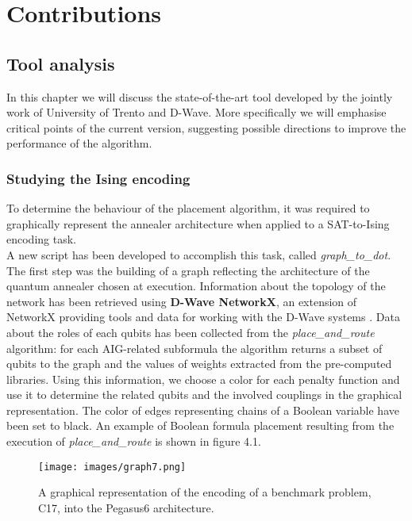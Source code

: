 \part{Contributions}

\chapter{Tool analysis}
\label{cha:analysis}

In this chapter we will discuss the state-of-the-art tool developed by the jointly work of University of Trento and D-Wave. More specifically we will emphasise critical points of the current version, suggesting possible directions to improve the performance of the algorithm.

\section{Studying the Ising encoding}

To determine the behaviour of the placement algorithm, it was required to graphically represent the annealer architecture when applied to a SAT-to-Ising encoding task. \\
A new script has been developed to accomplish this task, called \textit{graph\_to\_dot}. The first step was the building of a graph reflecting the architecture of the quantum annealer chosen at execution. Information about the topology of the network has been retrieved using \textbf{D-Wave NetworkX}, an extension of NetworkX providing tools and data for working with the D-Wave systems \cite{dwavenetx}. Data about the roles of each qubits has been collected from the \textit{place\_and\_route} algorithm: for each AIG-related subformula the algorithm returns a subset of qubits to the graph and the values of weights extracted from the pre-computed libraries. Using this information, we choose a color for each penalty function and use it to determine the related qubits and the involved couplings in the graphical representation. The color of edges representing chains of a Boolean variable have been set to black. 
An example of Boolean formula placement resulting from the execution of \textit{place\_and\_route} is shown in figure 4.1.

\begin{figure}[]
	\begin{center}
	\texttt{[image: images/graph7.png]}
	\caption{A graphical representation of the encoding of a benchmark problem, C17, into the Pegasus6 architecture.}
	\end{center}
\end{figure}

